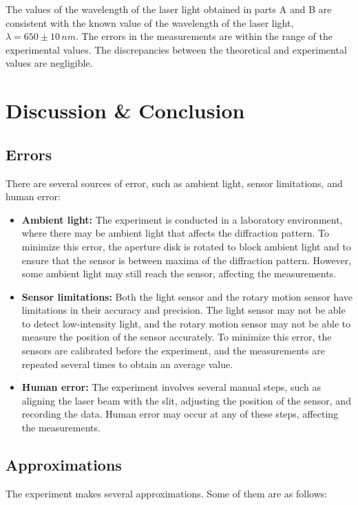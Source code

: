 \documentclass[10pt]{article}
\begin{document}
The values of the wavelength of the laser light obtained in parts A and B are consistent with the known value of the wavelength of the laser light, $\lambda = 650 \pm 10\,\unit{nm}$. The errors in the measurements are within the range of the experimental values. The discrepancies between the theoretical and experimental values are negligible.

\section{Discussion \& Conclusion}

\subsection*{Errors}

There are several sources of error, such as ambient light, sensor limitations, and human error:
\begin{itemize}
  \item \textbf{Ambient light:} The experiment is conducted in a laboratory environment, where there may be ambient light that affects the diffraction pattern. To minimize this error, the aperture disk is rotated to block ambient light and to ensure that the sensor is between maxima of the diffraction pattern. However, some ambient light may still reach the sensor, affecting the measurements.
  \item \textbf{Sensor limitations:} Both the light sensor and the rotary motion sensor have limitations in their accuracy and precision. The light sensor may not be able to detect low-intensity light, and the rotary motion sensor may not be able to measure the position of the sensor accurately. To minimize this error, the sensors are calibrated before the experiment, and the measurements are repeated several times to obtain an average value.
  \item \textbf{Human error:} The experiment involves several manual steps, such as aligning the laser beam with the slit, adjusting the position of the sensor, and recording the data. Human error may occur at any of these steps, affecting the measurements. 
\end{itemize}

\subsection*{Approximations}

The experiment makes several approximations. Some of them are as follows:
\end{document}
